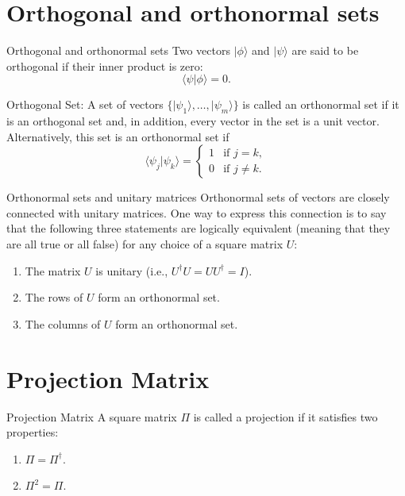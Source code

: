 \documentclass[12pt, aspectratio=169]{beamer}
\begin{document}
\section{Orthogonal and orthonormal sets}
\begin{frame}{Orthogonal and orthonormal sets}
Two vectors $\vert \phi \rangle$ and $\vert \psi \rangle$ are said to be orthogonal if their inner product is zero:
\[
\langle \psi \vert \phi \rangle = 0.
\]

Orthogonal Set:
A set of vectors $\{\vert \psi_1 \rangle, \ldots, \vert \psi_m \rangle\}$ is called an orthonormal set if it is an orthogonal set and, in addition, every vector in the set is a unit vector. Alternatively, this set is an orthonormal set if
\[
\langle \psi_j \vert \psi_k \rangle = 
\begin{cases}
1 & \text{if } j = k, \\
0 & \text{if } j \neq k.
\end{cases}
\]

\end{frame}
\begin{frame}{Orthonormal sets and unitary matrices}
Orthonormal sets of vectors are closely connected with unitary matrices. One way to express this connection is to say that the following three statements are logically equivalent (meaning that they are all true or all false) for any choice of a square matrix $U$:

\begin{enumerate}
    \item The matrix $U$ is unitary (i.e., $U^\dagger U = U U^\dagger = I$).
    \item The rows of $U$ form an orthonormal set.
    \item The columns of $U$ form an orthonormal set.
\end{enumerate}
\end{frame}
\section{Projection Matrix}
\begin{frame}{Projection Matrix}
A square matrix $\Pi$ is called a projection if it satisfies two properties:

\begin{enumerate}
    \item $\Pi = \Pi^\dagger$.
    \item $\Pi^2 = \Pi$.
\end{enumerate}
\end{frame}
\end{document}
